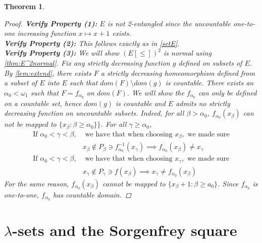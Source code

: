 \documentclass[11pt]{amsart}
\newtheorem{theorem}{Theorem}[section]
\theoremstyle{definition}
\theoremstyle{remark}
\theoremstyle{plain}
\begin{document}
\begin{theorem}
\begin{proof}
    \textbf{Verify Property (1): }$E$ is not 2-entangled since the uncountable one-to-one increasing function $x\mapsto x+1$ exists.\\ 
    \textbf{Verify Property (2): }This follows exactly as in \ref{setE}.\\
    \textbf{Verify Property (3): }We will show $(E[\leq])^2$ is normal using \ref{thm:E^2normal}. 
    Fix any strictly decreasing function $g$ defined on subsets of $E$. By \ref{lem:extend}, there exists $F$ a strictly decreasing homeomorphism defined from a subset of $E$ into $E$ such that $dom(F)\setminus dom(g)$ is countable. There exists an $\alpha_0<\omega_1$ such that $F=f_{\alpha_0}$ on $dom(F)$. We will show the $f_{\alpha_0}$ can only be defined on a countable set, hence $dom(g)$ is countable and $E$ admits no strictly decreasing function on uncountable subsets. Indeed, for all $\beta>\alpha_0$, $f_{\alpha_{0}}(x_{\beta})$ can not be mapped to $\{x_{\beta}:\beta \geq \alpha_0\}\}$. For all $\gamma\geq \alpha_0$,
    \begin{align*}
        \text{If } \alpha_0 <\gamma <\beta,& \text{ we have that when choosing }x_\beta, \text{ we made sure}\\
        &x_\beta\not \in P_{\beta}\ni f_{\alpha_0}^{-1}(x_\gamma)\implies f_{\alpha_0}(x_{\beta})\neq x_\gamma  \\ 
        \text{If } \alpha_0 <\gamma <\beta,& \text{ we have that when choosing } x_\gamma, \text{ we made sure} \\
        &x_\gamma \not \in P_{\gamma}\ni f(x_{\beta})\implies x_\gamma\neq f_{\alpha_0}(x_\beta) 
    \end{align*}
    For the same reason, $f_{\alpha_0}(x_\beta)$ cannot be mapped to $\{ x_{\beta}+1: \beta\geq a_0\}$. Since $f_{\alpha_0}$ is one-to-one, $f_{\alpha_0}$ has countable domain.
    \end{proof}
\end{theorem}


\section{$\lambda$-sets and the Sorgenfrey square}
\end{document}
